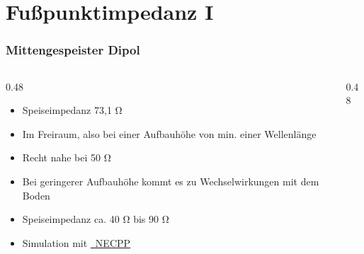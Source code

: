 \section{Fußpunktimpedanz I}
\label{section:fusspunktimpedanz_1}
\begin{frame}%
    \frametitle{Mittengespeister Dipol}
    \begin{columns}
        \begin{column}{0.48\linewidth}
            \begin{itemize}
                \item Speiseimpedanz 73,1 Ω
                \item Im Freiraum, also bei einer Aufbauhöhe von min. einer Wellenlänge
                \item Recht nahe bei 50 Ω
                \item Bei geringerer Aufbauhöhe kommt es zu Wechselwirkungen mit dem Boden
                \item Speiseimpedanz ca. 40 Ω bis 90 Ω
                \item Simulation mit \href{https://gist.github.com/myzinsky/3390169527cc4dc6d3325602c7704804}{\textcolor{DARCblue}{\faLink~NECPP}}
            \end{itemize}
        \end{column}
        \begin{column}{0.48\linewidth}
        \end{column}
    \end{columns}
\end{frame}

\begin{frame}
\end{frame}

